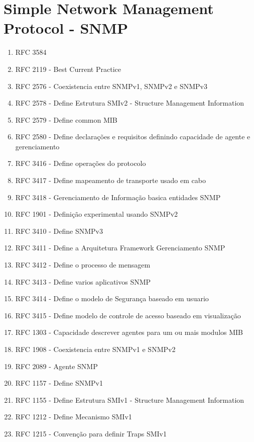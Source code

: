 \documentclass[12pt, brazil, ruledheader, pnumromarab,normaltoc]{abnt}
\begin{document}
\section{Simple Network Management Protocol - SNMP} \label{sec:snmp}
\begin{enumerate}
\item RFC 3584\cite{rfc-3584}
\item RFC 2119 - Best Current Practice
\item RFC 2576 - Coexistencia entre SNMPv1, SNMPv2 e SNMPv3
\item RFC 2578 - Define Estrutura SMIv2 - Structure Management Information
\item RFC 2579 - Define common MIB
\item RFC 2580 - Define declarações e requisitos definindo capacidade de agente e gerenciamento
\item RFC 3416 - Define operações do protocolo
\item RFC 3417 - Define mapeamento de transporte usado em cabo
\item RFC 3418 - Gerenciamento de Informação basica entidades SNMP
\item RFC 1901 - Definição experimental usando SNMPv2
\item RFC 3410 - Define SNMPv3
\item RFC 3411 - Define a Arquitetura Framework Gerenciamento SNMP
\item RFC 3412 - Define o processo de mensagem
\item RFC 3413 - Define varios aplicativos SNMP
\item RFC 3414 - Define o modelo de Segurança baseado em usuario
\item RFC 3415 - Define modelo de controle de acesso baseado em visualização
\item RFC 1303 - Capacidade descrever agentes para um ou mais modulos MIB
\item RFC 1908 - Coexistencia entre SNMPv1 e SNMPv2
\item RFC 2089 - Agente SNMP

\item RFC 1157 - Define SNMPv1
\item RFC 1155 - Define Estrutura SMIv1 - Structure Management Information
\item RFC 1212 - Define Mecanismo SMIv1 
\item RFC 1215 - Convenção para definir Traps SMIv1
\end{enumerate}
\end{document}
